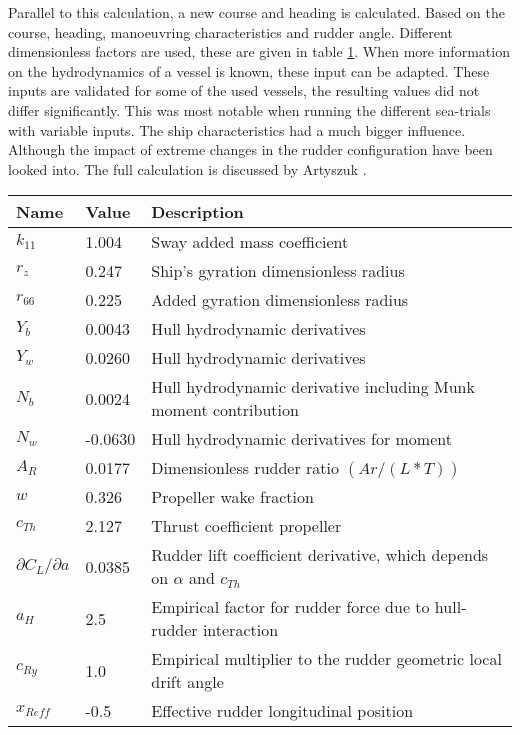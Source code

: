 Parallel to this calculation, a new course and heading is calculated. Based on the course, heading, manoeuvring characteristics and rudder angle. Different dimensionless factors are used, these are given in table \ref{tab:dimensionless-factors}. When more information on the hydrodynamics of a vessel is known, these input can be adapted. These inputs are validated for some of the used vessels, the resulting values did not differ significantly. This was most notable when running the different sea-trials with variable inputs. The ship characteristics had a much bigger influence. Although the impact of extreme changes in the rudder configuration have been looked into. The full calculation is discussed by Artyszuk \cite{Artyszuk2016}. 


\begin{table}[p]
	\centering
	\begin{tabular}{p{}|p{}|p{}}
		\toprule
		Name & Value & Description\\
		\midrule
		$k_{11}$ & 1.004 & Sway added mass coefficient \\
		$r_{z}$ & 0.247 & Ship's gyration dimensionless radius \\
		$r_{66}$ & 0.225 & Added gyration dimensionless radius \\
		$Y_{b}$ & 0.0043 & Hull hydrodynamic derivatives\\
		$Y_{w}$ & 0.0260 & Hull hydrodynamic derivatives\\
		$N_{b}$ & 0.0024 & Hull hydrodynamic derivative including Munk moment contribution \\
		$N_{w}$ & -0.0630 & Hull hydrodynamic derivatives for moment\\
		$A_{R}$ & 0.0177 & Dimensionless rudder ratio $(Ar/(L*T))$ \\
		$w$ & 0.326 & Propeller wake fraction \\
		$c_{Th}$ & 2.127 & Thrust coefficient propeller \\
		$\partial C_{L} / \partial a$ & 0.0385 & Rudder lift coefficient derivative, which depends on $\alpha$ and $c_{Th}$ \\
		
		$a_{H}$ & 2.5 & Empirical factor for rudder force due to hull‐rudder interaction \\
		$c_{Ry}$ & 1.0 & Empirical multiplier to the rudder geometric local drift angle \\
		$x_{Reff}$ & -0.5 & Effective rudder longitudinal position \\
		\bottomrule
	\end{tabular}
	
	\label{tab:dimensionless-factors}
\end{table}

